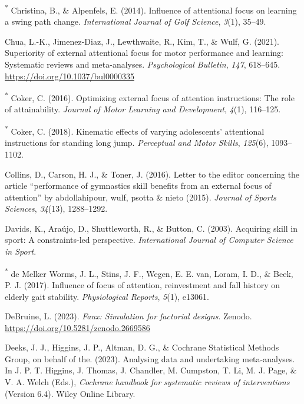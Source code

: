 \documentclass[
  man, donotrepeattitle,floatsintext]{apa7}
\newlength{\cslhangindent}
\newlength{\cslentryspacingunit} %
\newenvironment{CSLReferences}[2] %
 {%
  \setlength{\parindent}{0pt}
  \ifodd #1
  \let\oldpar\par
  \def\par{\hangindent=\cslhangindent\oldpar}
  \fi
  \setlength{\parskip}{#2\cslentryspacingunit}
 }%
 {}
\begin{document}
\begin{CSLReferences}{1}{0}
\leavevmode{}%
\textsuperscript{*} Christina, B., \& Alpenfels, E. (2014). Influence of attentional focus on learning a swing path change. \emph{International Journal of Golf Science}, \emph{3}(1), 35--49.

\leavevmode{}%
Chua, L.-K., Jimenez-Diaz, J., Lewthwaite, R., Kim, T., \& Wulf, G. (2021). Superiority of external attentional focus for motor performance and learning: {Systematic} reviews and meta-analyses. \emph{Psychological Bulletin}, \emph{147}, 618--645. \url{https://doi.org/10.1037/bul0000335}

\leavevmode{}%
\textsuperscript{*} Coker, C. (2016). Optimizing external focus of attention instructions: The role of attainability. \emph{Journal of Motor Learning and Development}, \emph{4}(1), 116--125.

\leavevmode{}%
\textsuperscript{*} Coker, C. (2018). Kinematic effects of varying adolescents' attentional instructions for standing long jump. \emph{Perceptual and Motor Skills}, \emph{125}(6), 1093--1102.

\leavevmode{}%
Collins, D., Carson, H. J., \& Toner, J. (2016). Letter to the editor concerning the article {``performance of gymnastics skill benefits from an external focus of attention''} by abdollahipour, wulf, psotta \& nieto (2015). \emph{Journal of Sports Sciences}, \emph{34}(13), 1288--1292.

\leavevmode{}%
Davids, K., Araújo, D., Shuttleworth, R., \& Button, C. (2003). Acquiring skill in sport: {A} constraints-led perspective. \emph{International Journal of Computer Science in Sport}.

\leavevmode{}%
\textsuperscript{*} de Melker Worms, J. L., Stins, J. F., Wegen, E. E. van, Loram, I. D., \& Beek, P. J. (2017). Influence of focus of attention, reinvestment and fall history on elderly gait stability. \emph{Physiological Reports}, \emph{5}(1), e13061.

\leavevmode{}%
DeBruine, L. (2023). \emph{Faux: Simulation for factorial designs}. Zenodo. \url{https://doi.org/10.5281/zenodo.2669586}

\leavevmode{}%
Deeks, J. J., Higgins, J. P., Altman, D. G., \& Cochrane Statistical Methods Group, on behalf of the. (2023). Analysing data and undertaking meta-analyses. In J. P. T. Higgins, J. Thomas, J. Chandler, M. Cumpston, T. Li, M. J. Page, \& V. A. Welch (Eds.), \emph{Cochrane handbook for systematic reviews of interventions} (Version 6.4). Wiley Online Library.


\end{CSLReferences}
\end{document}
